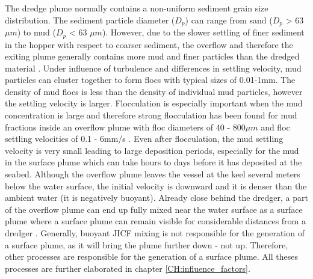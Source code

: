 \noindent The dredge plume normally contains a non-uniform sediment grain size distribution. The sediment particle diameter ($D_p$) can range from sand ($D_p$ > 63 $\mu m$) to mud ($D_p$ < 63 $\mu m$). However, due to the slower settling of finer sediment in the hopper with respect to coarser sediment, the overflow and therefore the exiting plume generally contains more mud and finer particles than the dredged material \citep{Rhee}. \newline
\noindent Under influence of turbulence and differences in settling velocity, mud particles can cluster together to form flocs with typical sizes of 0.01-1mm. The density of mud flocs is less than the density of individual mud particles, however the settling velocity is larger. Flocculation is especially important when the mud concentration is large and therefore strong flocculation has been found for mud fractions inside an overflow plume with floc diameters of 40 - 800$\mu m$ and floc settling velocities of 0.1 - 6mm/s \citep{Smith+}. Even after flocculation, the mud settling velocity is very small leading to large deposition periods, especially for the mud in the surface plume which can take hours to days before it has deposited at the seabed. Although the overflow plume leaves the vessel at the keel several meters below the water surface, the initial velocity is downward and it is denser than the ambient water (it is negatively buoyant). Already close behind the dredger, a part of the overflow plume can end up fully mixed near the water surface as a surface plume where a surface plume can remain visible for considerable distances from a dredger \citep{Newell+}. \newline \newline
\noindent Generally, buoyant JICF mixing is not responsible for the generation of a surface plume, as it will bring the plume further down - not up. Therefore, other processes are responsible for the generation of a surface plume. All theses processes are further elaborated in chapter \ref{CH:influence_factors}.

